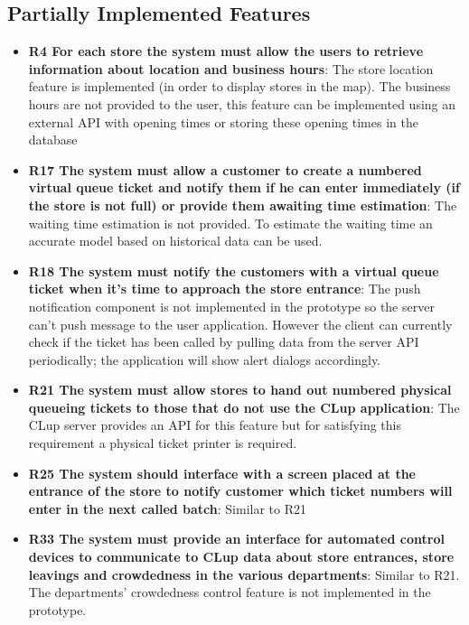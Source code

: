 \subsection{Partially Implemented Features}
\begin{itemize}
    \item \textbf{R4 For each store the system must allow the users to retrieve information about location and business hours}: The store location feature is implemented (in order to display stores in the map). The business hours are not provided to the user, this feature can be implemented using an external API with opening times or storing these opening times in the database
    \item \textbf{R17 The system must allow a customer to create a numbered virtual queue ticket and notify them if he can enter immediately (if the store is not full) or provide them awaiting time estimation}: The waiting time estimation is not provided. To estimate the waiting time an accurate model based on historical data can be used.
    \item \textbf{R18 The system must notify the customers with a virtual queue ticket when it’s time to approach the store entrance}:
          The push notification component is not implemented in the prototype so the server can't push message to the user application. However the client can currently check if the ticket has been called by pulling data from the server API periodically; the application will show alert dialogs accordingly.
    \item \textbf{R21 The system must allow stores to hand out numbered physical queueing tickets to those that do not use the CLup application}:
          The CLup server provides an API for this feature but for satisfying this requirement a physical ticket printer is required.
    \item \textbf{R25 The system should interface with a screen placed at the entrance of the store to notify customer which ticket numbers will enter in the next called batch}:
          Similar to R21
    \item \textbf{R33 The system must provide an interface for automated control devices to communicate to CLup data about store entrances, store leavings and crowdedness in the various departments}: Similar to R21. The departments' crowdedness control feature is not implemented in the prototype.

\end{itemize}

